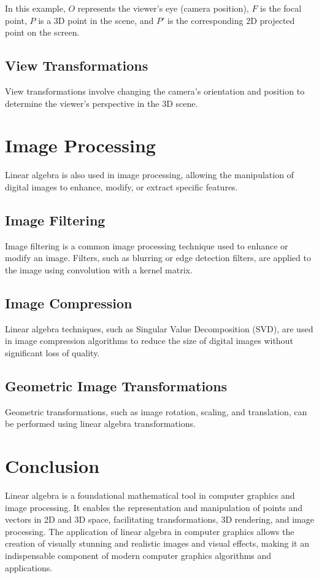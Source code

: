 \documentclass{article}
\begin{document}
In this example, $O$ represents the viewer's eye (camera position), $F$ is the focal point, $P$ is a 3D point in the scene, and $P'$ is the corresponding 2D projected point on the screen.

\subsection{View Transformations}
View transformations involve changing the camera's orientation and position to determine the viewer's perspective in the 3D scene.

\section{Image Processing}
Linear algebra is also used in image processing, allowing the manipulation of digital images to enhance, modify, or extract specific features.

\subsection{Image Filtering}
Image filtering is a common image processing technique used to enhance or modify an image. Filters, such as blurring or edge detection filters, are applied to the image using convolution with a kernel matrix.

\subsection{Image Compression}
Linear algebra techniques, such as Singular Value Decomposition (SVD), are used in image compression algorithms to reduce the size of digital images without significant loss of quality.

\subsection{Geometric Image Transformations}
Geometric transformations, such as image rotation, scaling, and translation, can be performed using linear algebra transformations.

\section{Conclusion}
Linear algebra is a foundational mathematical tool in computer graphics and image processing. It enables the representation and manipulation of points and vectors in 2D and 3D space, facilitating transformations, 3D rendering, and image processing. The application of linear algebra in computer graphics allows the creation of visually stunning and realistic images and visual effects, making it an indispensable component of modern computer graphics algorithms and applications.
\end{document}
